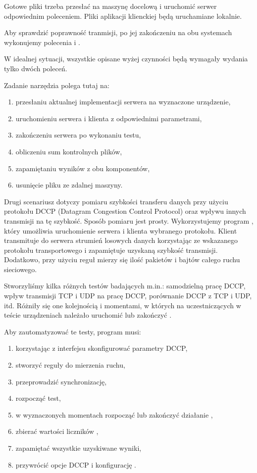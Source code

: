 \documentclass[00-praca-magisterska.tex]{subfiles}
\begin{document}
Gotowe pliki trzeba przesłać na maszynę docelową i uruchomić serwer odpowiednim
poleceniem. Pliki aplikacji klienckiej będą uruchamiane lokalnie.

Aby sprawdzić poprawność tranmisji, po jej zakończeniu na obu systemach
wykonujemy polecenia  i .

W idealnej sytuacji, wszystkie opisane wyżej czynności będą wymagały wydania
tylko dwóch poleceń.

Zadanie narzędzia polega tutaj na:
\begin{enumerate}
\item przesłaniu aktualnej implementacji serwera na wyznaczone urządzenie,
\item uruchomieniu serwera i klienta z odpowiednimi parametrami,
\item zakończeniu serwera po wykonaniu testu,
\item obliczeniu sum kontrolnych plików,
\item zapamiętaniu wyników z obu komponentów,
\item usunięcie pliku ze zdalnej maszyny.
\end{enumerate}

Drugi scenariusz dotyczy pomiaru szybkości transferu danych przy użyciu
protokołu DCCP (Datagram Congestion Control Protocol) oraz wpływu innych
transmisji na tę szybkość. Sposób pomiaru jest prosty. Wykorzystujemy program
, który umożliwia uruchomienie serwera i klienta wybranego
protokołu. Klient transmituje do serwera strumień losowych danych korzystając
ze wskazanego protokołu transportowego i zapamiętuje uzyskaną szybkość
transmisji. Dodatkowo, przy użyciu reguł  mierzy się ilość
pakietów i bajtów całego ruchu sieciowego.

Stworzyliśmy kilka różnych testów badających m.in.: samodzielną pracę DCCP,
wpływ transmisji TCP i UDP na pracę DCCP, porównanie DCCP z TCP i UDP, itd.
Różniły się one kolejnością i momentami, w których na uczestniczących w teście
urządzeniach należało uruchomić lub zakończyć .

Aby zautomatyzować te testy, program musi:
\begin{enumerate}
\item korzystając z interfejsu  skonfigurować parametry DCCP,
\item stworzyć reguły  do mierzenia ruchu,
\item przeprowadzić synchronizację, 
\item rozpocząć test,
\item w wyznaczonych momentach rozpocząć lub zakończyć działanie ,
\item zbierać wartości liczników ,
\item zapamiętać wszystkie uzyskiwane wyniki,
\item przywrócić opcje DCCP i konfigurację .
\end{enumerate}
\end{document}
